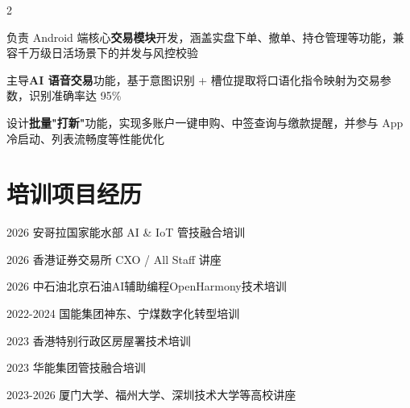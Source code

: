 \documentclass[]{deedy-resume-openfont}
\begin{document}
\begin{paracol}{2}
\begin{tightemize}
    \item 负责 Android 端核心\textbf{交易模块}开发，涵盖实盘下单、撤单、持仓管理等功能，兼容千万级日活场景下的并发与风控校验
    \item 主导\textbf{AI 语音交易}功能，基于意图识别 + 槽位提取将口语化指令映射为交易参数，识别准确率达 95\%
    \item 设计\textbf{批量"打新"}功能，实现多账户一键申购、中签查询与缴款提醒，并参与 App 冷启动、列表流畅度等性能优化
\end{tightemize}
\sectionsep

\section{培训项目经历}

\sectionsep

\begin{tightemize}
    \item 2026 安哥拉国家能水部 AI \& IoT 管技融合培训
    \item 2026 香港证券交易所 CXO / All Staff 讲座
    \item 2026 中石油北京石油AI辅助编程OpenHarmony技术培训
    \item 2022-2024 国能集团神东、宁煤数字化转型培训
    \item 2023 香港特别行政区房屋署技术培训
    \item 2023 华能集团管技融合培训
    \item 2023-2026 厦门大学、福州大学、深圳技术大学等高校讲座
\end{tightemize}
\sectionsep


% 
% 

\end{paracol}
\end{document}
